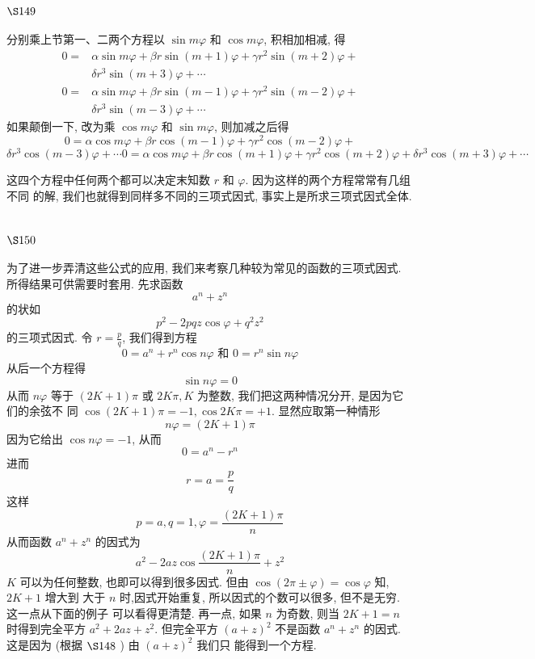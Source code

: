 \section{$\S 149$}

分别乘上节第一、二两个方程以 $\sin m \varphi$ 和 $\cos m \varphi$, 积相加相减, 得
\[
\begin{aligned}
0= & \alpha \sin m \varphi+\beta r \sin (m+1) \varphi+\gamma r^{2} \sin (m+2) \varphi+ \\
& \delta r^{3} \sin (m+3) \varphi+\cdots \\
0= & \alpha \sin m \varphi+\beta r \sin (m-1) \varphi+\gamma r^{2} \sin (m-2) \varphi+ \\
& \delta r^{3} \sin (m-3) \varphi+\cdots
\end{aligned}
\]
如果颠倒一下, 改为乘 $\cos m \varphi$ 和 $\sin m \varphi$, 则加减之后得
\[
0=\alpha \cos m \varphi+\beta r \cos (m-1) \varphi+\gamma r^{2} \cos (m-2) \varphi+
\]
 $\delta r^{3} \cos (m-3) \varphi+\cdots 0=\alpha \cos m \varphi+\beta r \cos (m+1) \varphi+\gamma r^{2} \cos (m+2) \varphi+ \delta r^{3} \cos (m+3) \varphi+\cdots$

这四个方程中任何两个都可以决定末知数 $r$ 和 $\varphi$. 因为这样的两个方程常常有几组不同 的解, 我们也就得到同样多不同的三项式因式, 事实上是所求三项式因式全体.

\section{$\S 150$}

为了进一步弄清这些公式的应用, 我们来考察几种较为常见的函数的三项式因式. 所得结果可供需要时套用. 先求函数
\[
a^{n}+z^{n}
\]
的状如
\[
p^{2}-2 p q z \cos \varphi+q^{2} z^{2}
\]
的三项式因式. 令 $r=\frac{p}{q}$, 我们得到方程
\[
0=a^{n}+r^{n} \cos n \varphi \text { 和 } 0=r^{n} \sin n \varphi
\]
从后一个方程得
\[
\sin n \varphi=0
\]
从而 $n \varphi$ 等于 $(2 K+1) \pi$ 或 $2 K \pi, K$ 为整数, 我们把这两种情况分开, 是因为它们的余弦不 同 $\cos (2 K+1) \pi=-1, \cos 2 K \pi=+1$. 显然应取第一种情形
\[
n \varphi=(2 K+1) \pi
\]
因为它给出 $\cos n \varphi=-1$, 从而
\[
0=a^{n}-r^{n}
\]
进而
\[
r=a=\frac{p}{q}
\]
这样
\[
p=a, q=1, \varphi=\frac{(2 K+1) \pi}{n}
\]
从而函数 $a^{n}+z^{n}$ 的因式为
\[
a^{2}-2 a z \cos \frac{(2 K+1) \pi}{n}+z^{2}
\]
$K$ 可以为任何整数, 也即可以得到很多因式. 但由 $\cos (2 \pi \pm \varphi)=\cos \varphi$ 知, $2 K+1$ 增大到 大于 $n$ 时,因式开始重复, 所以因式的个数可以很多, 但不是无穷. 这一点从下面的例子 可以看得更清楚. 再一点, 如果 $n$ 为奇数, 则当 $2 K+1=n$ 时得到完全平方 $a^{2}+2 a z+z^{2}$. 但完全平方 $(a+z)^{2}$ 不是函数 $a^{n}+z^{n}$ 的因式. 这是因为 (根据 $\S 148$ ) 由 $(a+z)^{2}$ 我们只 能得到一个方程.

